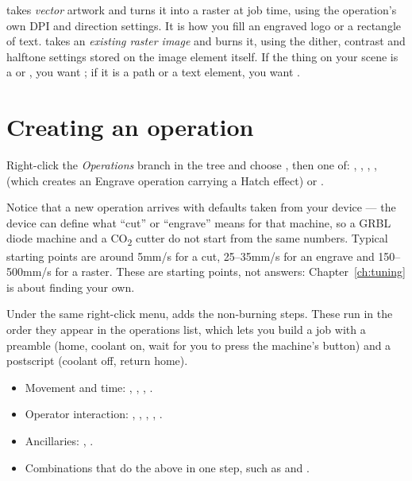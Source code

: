 \begin{notebox}
 takes \emph{vector} artwork and turns it into a raster at job
time, using the operation's own DPI and direction settings. It is how you fill an
engraved logo or a rectangle of text.  takes an \emph{existing
raster image} and burns it, using the dither, contrast and halftone settings
stored on the image element itself. If the thing on your scene is a
 or , you want ; if it is a path or a text
element, you want .
\end{notebox}

\section{Creating an operation}

Right-click the \emph{Operations} branch in the tree and choose , then one of: , ,
, ,  (which creates an
Engrave operation carrying a Hatch effect) or .

Notice that a new operation arrives with defaults taken from your device --- the
device can define what ``cut'' or ``engrave'' means for that machine, so a GRBL
diode machine and a CO\textsubscript{2} cutter do not start from the same
numbers. Typical starting points are around 5\unit{mm/s} for a cut,
25--35\unit{mm/s} for an engrave and 150--500\unit{mm/s} for a raster. These are
starting points, not answers: Chapter~\ref{ch:tuning} is about finding your own.

Under the same right-click menu,  adds the
non-burning steps. These run in the order they appear in the operations list,
which lets you build a job with a preamble (home, coolant on, wait for you to
press the machine's button) and a postscript (coolant off, return home).

\begin{itemize}[leftmargin=1.4em,itemsep=0pt]
  \item Movement and time: , ,
        , .
  \item Operator interaction: , ,
        , , .
  \item Ancillaries: , .
  \item Combinations that do the above in one step, such as
         and
        .
\end{itemize}

